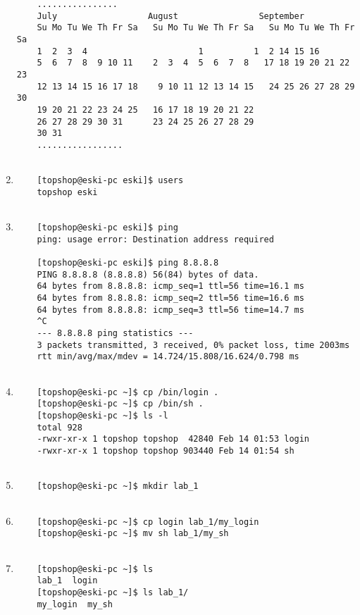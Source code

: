 \documentclass{article}
\begin{document}
\begin{enumerate}
\begin{verbatim}
	................               
	July                  August                September     
	Su Mo Tu We Th Fr Sa   Su Mo Tu We Th Fr Sa   Su Mo Tu We Th Fr Sa
	1  2  3  4                      1          1  2 14 15 16
	5  6  7  8  9 10 11    2  3  4  5  6  7  8   17 18 19 20 21 22 23
	12 13 14 15 16 17 18    9 10 11 12 13 14 15   24 25 26 27 28 29 30
	19 20 21 22 23 24 25   16 17 18 19 20 21 22                       
	26 27 28 29 30 31      23 24 25 26 27 28 29                       
	30 31                                      
	.................
	
	\end{verbatim}
	\item \begin{verbatim}
	[topshop@eski-pc eski]$ users
	topshop eski
	
	\end{verbatim}
	\item \begin{verbatim}
	[topshop@eski-pc eski]$ ping
	ping: usage error: Destination address required
	
	[topshop@eski-pc eski]$ ping 8.8.8.8
	PING 8.8.8.8 (8.8.8.8) 56(84) bytes of data.
	64 bytes from 8.8.8.8: icmp_seq=1 ttl=56 time=16.1 ms
	64 bytes from 8.8.8.8: icmp_seq=2 ttl=56 time=16.6 ms
	64 bytes from 8.8.8.8: icmp_seq=3 ttl=56 time=14.7 ms
	^C
	--- 8.8.8.8 ping statistics ---
	3 packets transmitted, 3 received, 0% packet loss, time 2003ms
	rtt min/avg/max/mdev = 14.724/15.808/16.624/0.798 ms
	
	\end{verbatim}
	\item \begin{verbatim}
	[topshop@eski-pc ~]$ cp /bin/login .
	[topshop@eski-pc ~]$ cp /bin/sh .
	[topshop@eski-pc ~]$ ls -l
	total 928
	-rwxr-xr-x 1 topshop topshop  42840 Feb 14 01:53 login
	-rwxr-xr-x 1 topshop topshop 903440 Feb 14 01:54 sh
	
	\end{verbatim}
	\item \begin{verbatim}
	[topshop@eski-pc ~]$ mkdir lab_1
	
	\end{verbatim}
	\item \begin{verbatim}
	[topshop@eski-pc ~]$ cp login lab_1/my_login
	[topshop@eski-pc ~]$ mv sh lab_1/my_sh
	
	\end{verbatim}
	\item \begin{verbatim}
	[topshop@eski-pc ~]$ ls
	lab_1  login
	[topshop@eski-pc ~]$ ls lab_1/
	my_login  my_sh
	

\end{verbatim}
\end{enumerate}
\end{document}
